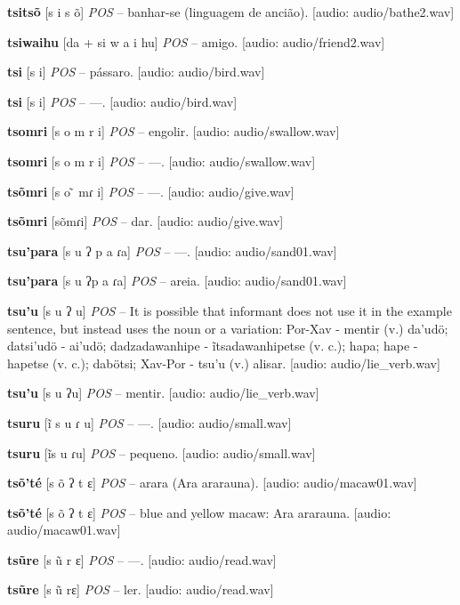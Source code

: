 \textbf{tsitsõ} [s i s õ] \textit{POS} -- banhar-se (linguagem de ancião). [audio: audio/bathe2.wav]{\faHeadphones}

\textbf{tsiwaihu} [da + si w a i hu] \textit{POS} -- amigo. [audio: audio/friend2.wav]{\faHeadphones}

\textbf{tsi} [s i] \textit{POS} -- pássaro. [audio: audio/bird.wav]{\faHeadphones}

\textbf{tsi} [s i] \textit{POS} -- —. [audio: audio/bird.wav]{\faHeadphones}

\textbf{tsomri} [s o m r i] \textit{POS} -- engolir. [audio: audio/swallow.wav]{\faHeadphones}

\textbf{tsomri} [s o m r i] \textit{POS} -- —. [audio: audio/swallow.wav]{\faHeadphones}

\textbf{tsõmri} [s o ̃ mɾ i] \textit{POS} -- —. [audio: audio/give.wav]{\faHeadphones}

\textbf{tsõmri} [sõmɾi] \textit{POS} -- dar. [audio: audio/give.wav]{\faHeadphones}

\textbf{tsu'para} [s u ʔ p a ɾa] \textit{POS} -- —. [audio: audio/sand01.wav]{\faHeadphones}

\textbf{tsu'para} [s u ʔp a ɾa] \textit{POS} -- areia. [audio: audio/sand01.wav]{\faHeadphones}

\textbf{tsu'u} [s u ʔ u] \textit{POS} -- It is possible that informant does not use it in the example sentence, but instead uses the noun or a variation: Por-Xav - mentir (v.) da'udö; datsi'udö - ai'udö; dadzadawanhipe - ĩtsadawanhipetse (v. c.); hapa; hape - hapetse (v. c.); dabötsi; Xav-Por - tsu'u (v.) alisar. [audio: audio/lie_verb.wav]{\faHeadphones}

\textbf{tsu'u} [s u ʔu] \textit{POS} -- mentir. [audio: audio/lie_verb.wav]{\faHeadphones}

\textbf{tsuru} [ĩ s u ɾ u] \textit{POS} -- —. [audio: audio/small.wav]{\faHeadphones}

\textbf{tsuru} [ĩs u ɾu] \textit{POS} -- pequeno. [audio: audio/small.wav]{\faHeadphones}

\textbf{tsõ'té} [s õ ʔ t ɛ] \textit{POS} -- arara (Ara ararauna). [audio: audio/macaw01.wav]{\faHeadphones}

\textbf{tsõ'té} [s õ ʔ t ɛ] \textit{POS} -- blue and yellow macaw: Ara ararauna. [audio: audio/macaw01.wav]{\faHeadphones}

\textbf{tsũre} [s ũ r ɛ] \textit{POS} -- —. [audio: audio/read.wav]{\faHeadphones}

\textbf{tsũre} [s ũ rɛ] \textit{POS} -- ler. [audio: audio/read.wav]{\faHeadphones}

